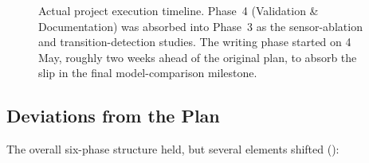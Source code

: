 \begin{figure}[H]
{{\begin{ganttchart}
    \end{ganttchart}
    }}
    \caption{Actual project execution timeline. Phase~4 (Validation \&
    Documentation) was absorbed into Phase~3 as the sensor-ablation
    and transition-detection studies. The writing phase started on
    4 May, roughly two weeks ahead of the original plan, to absorb
    the slip in the final model-comparison milestone.}
    \label{fig:gantt_actual}
\end{figure}


\subsection{Deviations from the Plan}

The overall six-phase structure held, but several elements shifted
():

